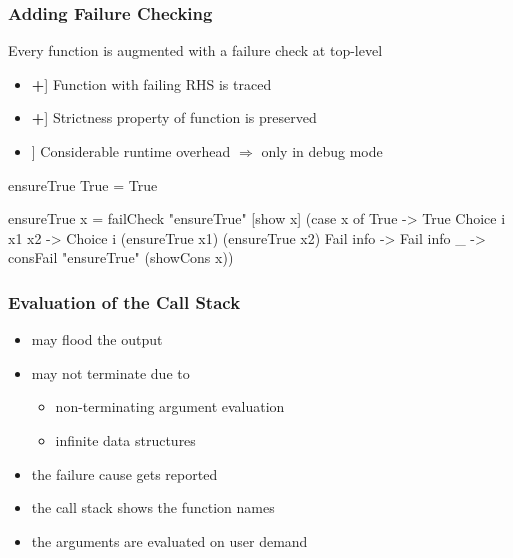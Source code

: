 \documentclass[
,xcolor=dvipsnames
]{beamer}
\newcommand{\ergo}{$\Rightarrow$}
\newcommand{\pro}{\makebox[1ex]{\color{Green}\bfseries +}}
\newcommand{\con}{\makebox[1ex]{\color{Red}  \bfseries \textendash}}
\begin{document}
\begin{frame}[fragile]%
\frametitle{Adding Failure Checking}

Every function is augmented with a failure check at top-level

\begin{itemize}
\item[\pro] Function with failing RHS is traced
\item[\pro] Strictness property of function is preserved
\item[\con] Considerable runtime overhead \ergo{} only in debug mode
\end{itemize}

\pause

\begin{curry}
ensureTrue True = True
\end{curry}

\begin{haskell}
ensureTrue x = \alert{failCheck "{}ensureTrue" [show x]} (case x of
  True           -> True
  Choice i x1 x2 -> Choice i (ensureTrue x1) (ensureTrue x2)
  Fail info      -> Fail info
  _              -> consFail "{}ensureTrue" (showCons x))
\end{haskell}
\end{frame}

\begin{frame}[fragile]%
\frametitle{Evaluation of the Call Stack}


\begin{itemize}
\item may flood the output
\item may not terminate due to
\begin{itemize}
 \item non-terminating argument evaluation
 \item infinite data structures
\end{itemize}
\end{itemize}

\pause


\begin{itemize}
\item the failure cause gets reported
  \item the call stack shows the function names
  \item the arguments are evaluated on user demand
\end{itemize}

\end{frame}
\end{document}
